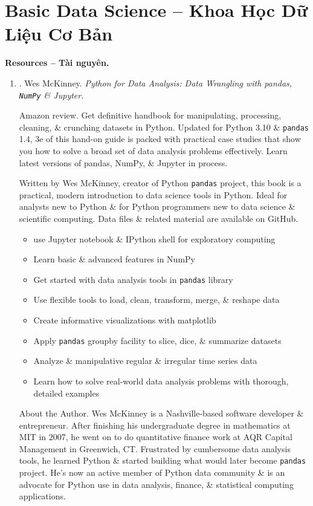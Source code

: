 \documentclass{article}
\begin{document}
\section{Basic Data Science -- Khoa Học Dữ Liệu Cơ Bản}
\textbf{\textsf{Resources -- Tài nguyên.}}
\begin{enumerate}
	\item \cite{McKinney2022}. {\sc Wes McKinney}. {\it Python for Data Analysis: Data Wrangling with pandas, {\tt NumPy} \& Jupyter}. {}
	
	{\sf Amazon review.} Get definitive handbook for manipulating, processing, cleaning, \& crunching datasets in Python. Updated for Python 3.10 \& {\tt pandas} 1.4, 3e of this hand-on guide is packed with practical case studies that show you how to solve a broad set of data analysis problems effectively. Learn latest versions of pandas, NumPy, \& Jupyter in process.
	
	Written by {\sc Wes McKinney}, creator of Python {\tt pandas} project, this book is a practical, modern introduction to data science tools in Python. Ideal for analysts new to Python \& for Python programmers new to data science \& scientific computing. Data files \& related material are available on GitHub.
	\begin{itemize}
		\item use Jupyter notebook \& IPython shell for exploratory computing
		\item Learn basic \& advanced features in NumPy
		\item Get started with data analysis tools in {\tt pandas} library
		\item Use flexible tools to load, clean, transform, merge, \& reshape data
		\item Create informative visualizations with matplotlib
		\item Apply {\tt pandas} groupby facility to slice, dice, \& summarize datasets
		\item Analyze \& manipulative regular \& irregular time series data
		\item Learn how to solve real-world data analysis problems with thorough, detailed examples
	\end{itemize}
	{\sf About the Author.} {\sc Wes McKinney} is a Nashville-based software developer \& entrepreneur. After finishing his undergraduate degree in mathematics at MIT in 2007, he went on to do quantitative finance work at AQR Capital Management in Greenwich, CT. Frustrated by cumbersome data analysis tools, he learned Python \& started building what would later become {\tt pandas} project. He's now an active member of Python data community \& is an advocate for Python use in data analysis, finance, \& statistical computing applications.
	

\end{enumerate}
\end{document}
